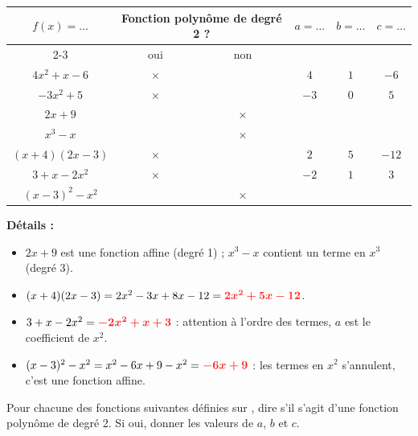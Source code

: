 \documentclass[11pt,a4paper]{book}
\begin{document}
\begin{corrBox}
	\begin{center}
		\setlength{\extrarowheight}{3pt}
		\setlength{\tabcolsep}{0.3cm}
		\begin{tabular}{|c|c|c|c|c|c|}
			\hline
			\multirow{2}{*}{$f(x)=\ldots$} & \multicolumn{2}{c|}{Fonction polynôme de degré 2 ?} & \multirow{2}{*}{$a=\ldots$} & \multirow{2}{*}{$b=\ldots$} & \multirow{2}{*}{$c=\ldots$} \\
			\cline{2-3}
			& oui & non & & & \\
			\hline $4x^2+x-6$ & $\times$ & & $4$ & $1$ & $-6$ \\
			\hline $-3x^2+5$ & $\times$ & & $-3$ & $0$ & $5$ \\
			\hline $2x+9$ & & $\times$ & & & \\
			\hline $x^3-x$ & & $\times$ & & & \\
			\hline $(x+4)(2x-3)$ & $\times$ & & $2$ & $5$ & $-12$ \\
			\hline $3+x-2x^2$ & $\times$ & & $-2$ & $1$ & $3$ \\
			\hline $(x-3)^2-x^2$ & & $\times$ & & & \\
			\hline
		\end{tabular}
	\end{center}

	\textbf{Détails :}
	\begin{itemize}
		\item $2x+9$ est une fonction affine (degré 1) ; $x^3-x$ contient un terme en $x^3$ (degré 3).
		\item $(x+4)(2x-3)=2x^2-3x+8x-12=\mRouge{2x^2+5x-12}$.
		\item $3+x-2x^2=\mRouge{-2x^2+x+3}$ : attention à l'ordre des termes, $a$ est le coefficient de $x^2$.
		\item $(x-3)^2-x^2=x^2-6x+9-x^2=\mRouge{-6x+9}$ : les termes en $x^2$ s'annulent, c'est une fonction affine.
	\end{itemize}
\end{corrBox}

\exerciceDS{}

Pour chacune des fonctions suivantes définies sur \R, dire s'il s'agit d'une fonction polynôme de degré 2. Si oui, donner les valeurs de $a$, $b$ et $c$.
\end{document}
